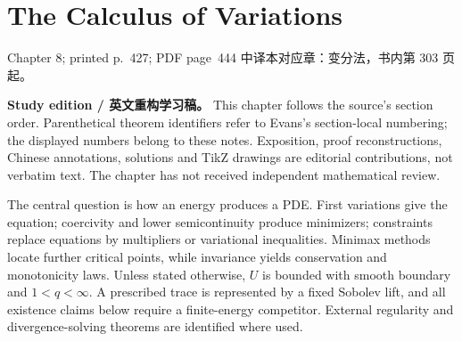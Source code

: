 \chapter{The Calculus of Variations}
\label{chap:the-calculus-of-variations}

\PDESource
  {Chapter 8; printed p.~427; PDF page~444}
  {中译本对应章：变分法，书内第 303 页起。}

\noindent\textbf{Study edition / 英文重构学习稿。}
This chapter follows the source's section order. Parenthetical theorem
identifiers refer to Evans's section-local numbering; the displayed numbers
belong to these notes. Exposition, proof reconstructions, Chinese annotations,
solutions and TikZ drawings are editorial contributions, not verbatim text.
The chapter has not received independent mathematical review.

\medskip
The central question is how an energy produces a PDE. First variations give
the equation; coercivity and lower semicontinuity produce minimizers;
constraints replace equations by multipliers or variational inequalities.
Minimax methods locate further critical points, while invariance yields
conservation and monotonicity laws. Unless stated otherwise, $U$ is bounded
with smooth boundary and $1<q<\infty$. A prescribed trace is represented
by a fixed Sobolev lift, and all existence claims below require a finite-energy
competitor. External regularity and divergence-solving theorems are identified
where used.










